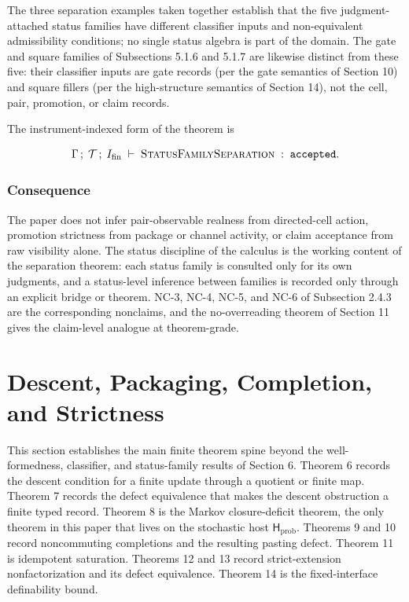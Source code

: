 \documentclass[11pt]{article}
\theoremstyle{definition}
\begin{document}
The three separation examples taken together establish that the five judgment-attached status families have different classifier inputs and non-equivalent admissibility conditions; no single status algebra is part of the domain. The gate and square families of Subsections 5.1.6 and 5.1.7 are likewise distinct from these five: their classifier inputs are gate records (per the gate semantics of Section 10) and square fillers (per the high-structure semantics of Section 14), not the cell, pair, promotion, or claim records.

The instrument-indexed form of the theorem is

\[
\Gamma\,;\;\mathcal T\,;\;I_{\mathrm{fin}}\;\vdash\;\textsc{StatusFamilySeparation}\;:\;\texttt{accepted}.
\]

\subsubsection{Consequence}

The paper does not infer pair-observable realness from directed-cell action, promotion strictness from package or channel activity, or claim acceptance from raw visibility alone. The status discipline of the calculus is the working content of the separation theorem: each status family is consulted only for its own judgments, and a status-level inference between families is recorded only through an explicit bridge or theorem. NC-3, NC-4, NC-5, and NC-6 of Subsection 2.4.3 are the corresponding nonclaims, and the no-overreading theorem of Section 11 gives the claim-level analogue at theorem-grade.
 \section{Descent, Packaging, Completion, and Strictness}

This section establishes the main finite theorem spine beyond the well-formedness, classifier, and status-family results of Section 6. Theorem 6 records the descent condition for a finite update through a quotient or finite map. Theorem 7 records the defect equivalence that makes the descent obstruction a finite typed record. Theorem 8 is the Markov closure-deficit theorem, the only theorem in this paper that lives on the stochastic host \(\mathsf H_{\mathrm{prob}}\). Theorems 9 and 10 record noncommuting completions and the resulting pasting defect. Theorem 11 is idempotent saturation. Theorems 12 and 13 record strict-extension nonfactorization and its defect equivalence. Theorem 14 is the fixed-interface definability bound.
\end{document}
